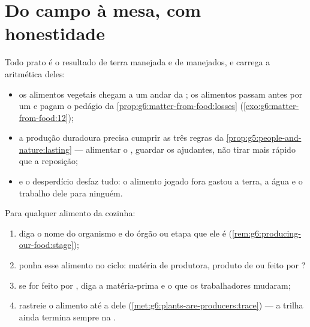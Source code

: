 \section{Do campo à mesa, com honestidade}

\begin{proposition}\label{prop:g6:producing-our-food:costs}
Todo prato é o resultado de terra manejada e de  manejados,
e carrega a aritmética deles:
\begin{itemize}
  \item os alimentos vegetais chegam a um andar da ; os alimentos
         passam antes por um  e pagam o pedágio da
        \cref{prop:g6:matter-from-food:losses}
        (\cref{exo:g6:matter-from-food:12});
  \item a produção duradoura precisa cumprir as três regras da
        \cref{prop:g5:people-and-nature:lasting} --- alimentar o ,
        guardar os ajudantes, não tirar mais rápido que a reposição;
  \item e o desperdício desfaz tudo: o alimento jogado fora gastou a
        terra, a água e o trabalho dele para ninguém.
\end{itemize}
\end{proposition}
\admitted

\begin{method}\label{met:g6:producing-our-food:read}
Para qualquer alimento da cozinha:
\begin{enumerate}
  \item diga o nome do organismo e do órgão ou etapa que ele é
        (\cref{rem:g6:producing-our-food:stage});
  \item ponha esse alimento no ciclo: matéria de produtora, produto
        de  ou feito por ?
  \item se for feito por , diga a matéria-prima e o que os
        trabalhadores mudaram;
  \item rastreie o alimento até a  dele
        (\cref{met:g6:plants-are-producers:trace}) --- a trilha ainda
        termina sempre na .
\end{enumerate}
\end{method}

